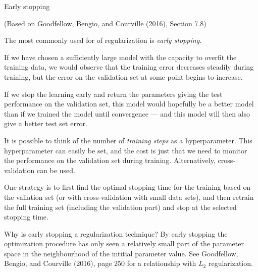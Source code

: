\documentclass[10pt,ignorenonframetext,]{beamer}
\begin{document}
\begin{frame}

\begin{block}{Early stopping}

(Based on Goodfellow, Bengio, and Courville (2016), Section 7.8)

The most commonly used for of regularization is \emph{early stopping}.

If we have chosen a sufficiently large model with the capacity to
overfit the training data, we would observe that the training error
decreases steadily during training, but the error on the validation set
at some point begins to increase.

If we stop the learning early and return the parameters giving the test
performance on the validation set, this model would hopefully be a
better model than if we trained the model until convergence --- and this
model will then also give a better test set error.

\end{block}

\end{frame}

\begin{frame}

It is possible to think of the number of \emph{training steps} as a
hyperparameter. This hyperparameter can easily be set, and the cost is
just that we need to monitor the performance on the validation set
during training. Alternatively, cross-validation can be used.

One strategy is to first find the optimal stopping time for the training
based on the valiation set (or with cross-validation with small data
sets), and then retrain the full training set (including the validation
part) and stop at the selected stopping time.

Why is early stopping a regularization technique? By early stopping the
optimization procedure has only seen a relatively small part of the
parameter space in the neighbourhood of the intitial parameter value.
See Goodfellow, Bengio, and Courville (2016), page 250 for a
relationship with \(L_2\) regularization.

\end{frame}
\end{document}
